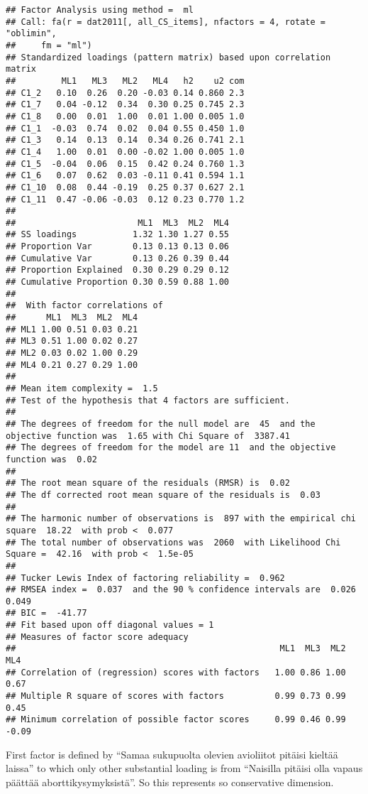 \documentclass[
]{article}
\begin{document}
\begin{verbatim}
## Factor Analysis using method =  ml
## Call: fa(r = dat2011[, all_CS_items], nfactors = 4, rotate = "oblimin", 
##     fm = "ml")
## Standardized loadings (pattern matrix) based upon correlation matrix
##         ML1   ML3   ML2   ML4   h2    u2 com
## C1_2   0.10  0.26  0.20 -0.03 0.14 0.860 2.3
## C1_7   0.04 -0.12  0.34  0.30 0.25 0.745 2.3
## C1_8   0.00  0.01  1.00  0.01 1.00 0.005 1.0
## C1_1  -0.03  0.74  0.02  0.04 0.55 0.450 1.0
## C1_3   0.14  0.13  0.14  0.34 0.26 0.741 2.1
## C1_4   1.00  0.01  0.00 -0.02 1.00 0.005 1.0
## C1_5  -0.04  0.06  0.15  0.42 0.24 0.760 1.3
## C1_6   0.07  0.62  0.03 -0.11 0.41 0.594 1.1
## C1_10  0.08  0.44 -0.19  0.25 0.37 0.627 2.1
## C1_11  0.47 -0.06 -0.03  0.12 0.23 0.770 1.2
## 
##                        ML1  ML3  ML2  ML4
## SS loadings           1.32 1.30 1.27 0.55
## Proportion Var        0.13 0.13 0.13 0.06
## Cumulative Var        0.13 0.26 0.39 0.44
## Proportion Explained  0.30 0.29 0.29 0.12
## Cumulative Proportion 0.30 0.59 0.88 1.00
## 
##  With factor correlations of 
##      ML1  ML3  ML2  ML4
## ML1 1.00 0.51 0.03 0.21
## ML3 0.51 1.00 0.02 0.27
## ML2 0.03 0.02 1.00 0.29
## ML4 0.21 0.27 0.29 1.00
## 
## Mean item complexity =  1.5
## Test of the hypothesis that 4 factors are sufficient.
## 
## The degrees of freedom for the null model are  45  and the objective function was  1.65 with Chi Square of  3387.41
## The degrees of freedom for the model are 11  and the objective function was  0.02 
## 
## The root mean square of the residuals (RMSR) is  0.02 
## The df corrected root mean square of the residuals is  0.03 
## 
## The harmonic number of observations is  897 with the empirical chi square  18.22  with prob <  0.077 
## The total number of observations was  2060  with Likelihood Chi Square =  42.16  with prob <  1.5e-05 
## 
## Tucker Lewis Index of factoring reliability =  0.962
## RMSEA index =  0.037  and the 90 % confidence intervals are  0.026 0.049
## BIC =  -41.77
## Fit based upon off diagonal values = 1
## Measures of factor score adequacy             
##                                                    ML1  ML3  ML2   ML4
## Correlation of (regression) scores with factors   1.00 0.86 1.00  0.67
## Multiple R square of scores with factors          0.99 0.73 0.99  0.45
## Minimum correlation of possible factor scores     0.99 0.46 0.99 -0.09
\end{verbatim}

First factor is defined by ``Samaa sukupuolta olevien avioliitot pitäisi
kieltää laissa'' to which only other substantial loading is from
``Naisilla pitäisi olla vapaus päättää aborttikysymyksistä''. So this
represents so conservative dimension.
\end{document}
